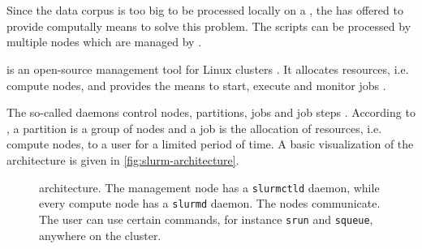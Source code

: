 
\section{\slurm{}}\label{subsec:slurm}

Since the data corpus is too big to be processed locally on a \localMaschineStats{}, the \thesisdepartment{} has offered to provide computally means to solve this problem.
The scripts can be processed by multiple nodes which are managed by \slurm{}.

\slurm{} is an open-source management tool for Linux clusters \cite{slurm-online}.
It allocates resources, i.e. compute nodes, and provides the means to start, execute and monitor jobs \cite{slurm-online, slurm2003}.

The so-called \slurm{} daemons control nodes, partitions, jobs and job steps \cite{slurm-online}.
According to \citeauthor{slurm-online}, a partition is a group of nodes and a job is the allocation of resources, i.e. compute nodes, to a user for a limited period of time.
A basic visualization of the architecture is given in \autoref{fig:slurm-architecture}.

\begin{figure}[htp] %
    \centering
    
    \caption{\slurm{} architecture. The management node has a \texttt{slurmctld} daemon, while every compute node has a \texttt{slurmd} daemon.
    The nodes communicate.
    The user can use certain commands, for instance \texttt{srun} and \texttt{squeue}, anywhere on the cluster.
    }
    \label{fig:slurm-architecture}
\end{figure}